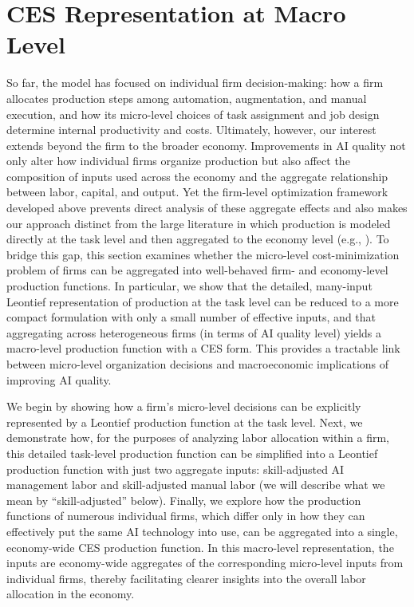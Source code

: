 \section{CES Representation at Macro Level}
\label{sec:aggregation}

So far, the model has focused on individual firm decision-making: how a firm allocates production steps among automation, augmentation, and manual execution, and how its micro-level choices of task assignment and job design determine internal productivity and costs.
Ultimately, however, our interest extends beyond the firm to the broader economy. 
Improvements in AI quality not only alter how individual firms organize production but also affect the composition of inputs used across the economy and the aggregate relationship between labor, capital, and output.
Yet the firm-level optimization framework developed above prevents direct analysis of these aggregate effects and also makes our approach distinct from the large literature in which production is modeled directly at the task level and then aggregated to the economy level (e.g., \cite{acemoglu2022artificial, acemoglu2024tasks, acemoglu2025simple}).
To bridge this gap, this section examines whether the micro-level cost-minimization problem of firms can be aggregated into well-behaved firm- and economy-level production functions. 
In particular, we show that the detailed, many-input Leontief representation of production at the task level can be reduced to a more compact formulation with only a small number of effective inputs, and that aggregating across heterogeneous firms (in terms of AI quality level) yields a macro-level production function with a CES form. 
This provides a tractable link between micro-level organization decisions and macroeconomic implications of improving AI quality.

We begin by showing how a firm's micro-level decisions can be explicitly represented by a Leontief production function at the task level.
Next, we demonstrate how, for the purposes of analyzing labor allocation within a firm, this detailed task-level production function can be simplified into a Leontief production function with just two aggregate inputs: skill-adjusted AI management labor and skill-adjusted manual labor (we will describe what we mean by ``skill-adjusted'' below).
Finally, we explore how the production functions of numerous individual firms, which differ only in how they can effectively put the same AI technology into use, can be aggregated into a single, economy-wide CES production function.
In this macro-level representation, the inputs are economy-wide aggregates of the corresponding micro-level inputs from individual firms, thereby facilitating clearer insights into the overall labor allocation in the economy.


